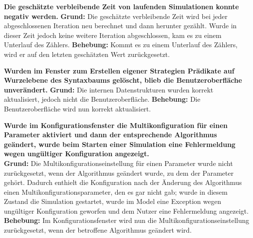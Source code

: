 \documentclass[parskip=full,11pt,openany]{scrreprt}
\begin{document}
\textbf{Die geschätzte verbleibende Zeit von laufenden Simulationen konnte negativ werden.} 
\newline
\textbf{Grund: }Die geschätzte verbleibende Zeit wird bei jeder abgeschlossenen Iteration neu berechnet und dann herunter gezählt. Wurde in dieser Zeit jedoch keine weitere Iteration abgeschlossen, kam es zu einem Unterlauf des Zählers. 
\newline
\textbf{Behebung: }Kommt es zu einem Unterlauf des Zählers, wird er auf den letzten geschätzten Wert zurückgesetzt.

\textbf{Wurden im Fenster zum Erstellen eigener Strategien Prädikate auf Wurzelebene des Syntaxbaums gelöscht, blieb die Benutzeroberfläche unverändert.} 
\newline
\textbf{Grund: } Die internen Datenstrukturen wurden  korrekt aktualisiert, jedoch nicht die Benutzeroberfläche.
\newline
\textbf{Behebung: } Die Benutzeroberfläche wird nun korrekt aktualisiert.

\textbf{Wurde im Konfigurationsfenster die Multikonfiguration für einen Parameter aktiviert und dann der entsprechende Algorithmus geändert, wurde beim Starten einer Simulation eine Fehlermeldung wegen ungültiger Konfiguration angezeigt.}\\
\textbf{Grund: } Die Multikonfigurationseinstellung für einen Parameter wurde nicht zurückgesetzt, wenn der Algorithmus geändert wurde, zu dem der Parameter gehört. Dadurch enthielt die Konfiguration nach der Änderung des Algorithmus einen Multikonfigurationsparameter, den es gar nicht gab; wurde in diesem Zustand die Simulation gestartet, wurde im Model eine Exception wegen ungültiger Konfiguration geworfen und dem Nutzer eine Fehlermeldung angezeigt.\\
\textbf{Behebung:} Im Konfigurationsfenster wird nun die Multikonfigurationseinstellung zurückgesetzt, wenn der betroffene Algorithmus geändert wird.
\end{document}
